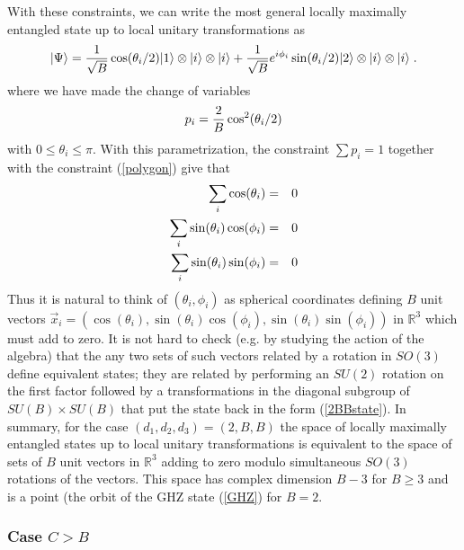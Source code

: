 \documentclass[12pt]{article}
\theoremstyle{definition}
\newcommand{\be}{\begin{equation}}
\newcommand{\ee}{\end{equation}}
\newcommand{\bea}{\begin{eqnarray}}
\newcommand{\eea}{\end{eqnarray}}
\begin{document}
With these constraints, we can write the most general locally maximally entangled state up to local unitary transformations as
\be
\label{2BBstate}
|\Psi \rangle = {1 \over \sqrt{B}} \cos(\theta_i /2) |1 \rangle  \otimes |i \rangle  \otimes |i \rangle + {1 \over \sqrt{B}} e^{i \phi_i} \sin(\theta_i /2) |2 \rangle  \otimes |i \rangle  \otimes |i \rangle  \; .
\ee
where we have made the change of variables
\be
p_i = {2 \over B} \cos^2(\theta_i/2)
\ee
with $0 \le \theta_i \le \pi$.
With this parametrization, the constraint $\sum p_i = 1$ together with the constraint (\ref{polygon}) give that
\bea
\sum_i \cos(\theta_i) &=& 0 \cr
\sum_i \sin(\theta_i) \cos(\phi_i) &=& 0 \cr
\sum_i \sin(\theta_i) \sin(\phi_i) &=& 0
\eea
Thus it is natural to think of $(\theta_i, \phi_i)$ as spherical coordinates defining $B$ unit vectors $\vec{x}_i = (\cos(\theta_i),\sin(\theta_i) \cos(\phi_i),\sin(\theta_i) \sin(\phi_i))$ in  $\mathbb{R}^3$ which must add to zero. It is not hard to check (e.g. by studying the action of the algebra) that the any two sets of such vectors related by a rotation in $SO(3)$ define equivalent states; they are related by performing an $SU(2)$ rotation on the first factor followed by a transformations in the diagonal subgroup of $SU(B) \times SU(B)$ that put the state back in the form (\ref{2BBstate}). In summary, for the case $(d_1,d_2,d_3) = (2,B,B)$ the space of locally maximally entangled states up to local unitary transformations is equivalent to the space of sets of $B$ unit vectors in $\mathbb{R}^3$ adding to zero modulo simultaneous $SO(3)$ rotations of the vectors. This space has complex dimension $B-3$ for $B \ge 3$ and is a point (the orbit of the GHZ state (\ref{GHZ}) for $B=2$.

\subsubsection*{Case $C>B$}
\end{document}
